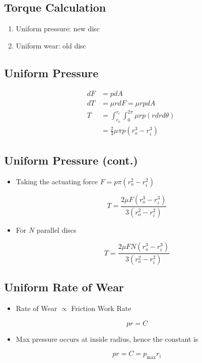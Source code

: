\documentclass[
10pt,
a4paper,
openany,
svgnames,
]{book}
\begin{document}
\subsection*{Torque Calculation}
\label{sec:org7c546a4}

\begin{enumerate}
\item Uniform pressure: new disc
\item Uniform wear: old disc
\end{enumerate}

\subsection*{Uniform Pressure}
\label{sec:org9509ecc}

\begin{align*}
    dF &= p dA \\
    dT &= \mu rdF = \mu r p dA \\
    T &= \int_{r_o}^{r_i} \int_0^{2\pi} \mu r p (rdrd\theta) \\
        &= \frac{2}{3} \mu \pi p \left( r_o^3 - r_i^3 \right)
\end{align*}

\subsection*{Uniform Pressure (cont.)}
\label{sec:org807c83d}

\begin{itemize}
\item Taking the actuating force \(F = p \pi (r_o^2 - r_i^2)\)

$$ T = \frac{2\mu F \left( r_o^3 - r_i^3 \right)}{3 \left( r_o^2 - r_i^2 \right)} $$

\item For \(N\) parallel discs

$$ T = \frac{2\mu F N \left( r_o^3 - r_i^3 \right)}{3 \left( r_o^2 - r_i^2 \right)} $$
\end{itemize}

\subsection*{Uniform Rate of Wear}
\label{sec:org8020dfc}

\begin{itemize}
\item Rate of Wear \(\propto\) Friction Work Rate

$$ pr = C $$

\item Max pressure occurs at inside radius, hence the constant is

$$ pr = C = p_{\max}r_i $$
\end{itemize}
\end{document}
